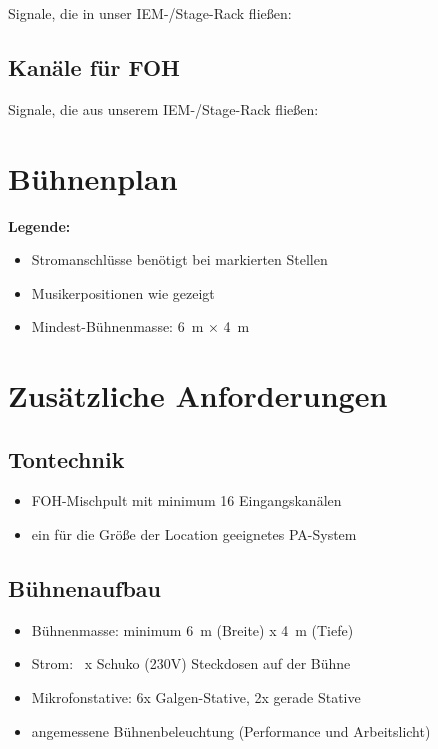 \documentclass[standard]{techrider}  %
\begin{document}
Signale, die in unser IEM-/Stage-Rack fließen:


\subsection{Kanäle für FOH}

Signale, die aus unserem IEM-/Stage-Rack fließen:

\outputChannelsTable


\section{Bühnenplan}

\drawStagePlot

\textbf{Legende:}
\begin{itemize}
    \item Stromanschlüsse benötigt bei markierten Stellen
    \item Musikerpositionen wie gezeigt  
    \item Mindest-Bühnenmasse: 6 m × 4 m
\end{itemize}


\section{Zusätzliche Anforderungen}

\subsection{Tontechnik}
\begin{itemize}
    \item FOH-Mischpult mit minimum 16 Eingangskanälen
    \item ein für die Größe der Location geeignetes PA-System
\end{itemize}

\subsection{Bühnenaufbau}
\begin{itemize}
    \item Bühnenmasse: minimum 6 m (Breite) x 4 m (Tiefe)
    \item Strom: \totalPowerNeeded\ x Schuko (230V) Steckdosen auf der Bühne
    \item Mikrofonstative: 6x Galgen-Stative, 2x gerade Stative
    \item angemessene Bühnenbeleuchtung (Performance und Arbeitslicht)
\end{itemize}
\end{document}
